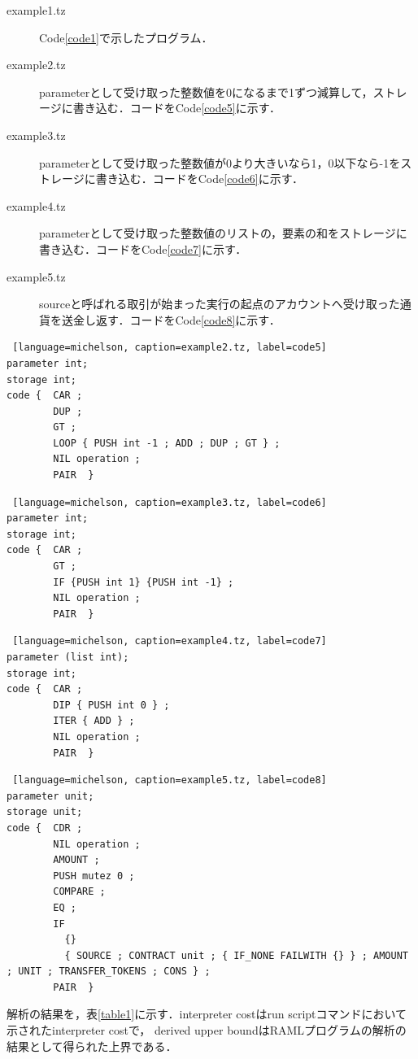 \documentclass{kuisthesis}
\begin{document}
\begin{description}
  \item [example1.tz] Code\ref{code1}で示したプログラム．
  \item [example2.tz] parameterとして受け取った整数値を0になるまで1ずつ減算して，ストレージに書き込む．コードをCode\ref{code5}に示す．
  \item [example3.tz] parameterとして受け取った整数値が0より大きいなら1，0以下なら-1をストレージに書き込む．コードをCode\ref{code6}に示す．
  \item [example4.tz] parameterとして受け取った整数値のリストの，要素の和をストレージに書き込む．コードをCode\ref{code7}に示す．
  \item [example5.tz] sourceと呼ばれる取引が始まった実行の起点のアカウントへ受け取った通貨を送金し返す．コードをCode\ref{code8}に示す．
\end{description}

\begin{lstlisting} [language=michelson, caption=example2.tz, label=code5]
parameter int;
storage int;
code {  CAR ;
        DUP ;
        GT ;
        LOOP { PUSH int -1 ; ADD ; DUP ; GT } ;
        NIL operation ;
        PAIR  }
\end{lstlisting}

\begin{lstlisting} [language=michelson, caption=example3.tz, label=code6]
parameter int;
storage int;
code {  CAR ;
        GT ;
        IF {PUSH int 1} {PUSH int -1} ;
        NIL operation ;
        PAIR  }
\end{lstlisting}

\begin{lstlisting} [language=michelson, caption=example4.tz, label=code7]
parameter (list int);
storage int;
code {  CAR ;
        DIP { PUSH int 0 } ;
        ITER { ADD } ;
        NIL operation ;
        PAIR  }
\end{lstlisting}

\begin{lstlisting} [language=michelson, caption=example5.tz, label=code8]
parameter unit;
storage unit;
code {  CDR ;
        NIL operation ;
        AMOUNT ;
        PUSH mutez 0 ;
        COMPARE ;
        EQ ;
        IF
          {}
          { SOURCE ; CONTRACT unit ; { IF_NONE FAILWITH {} } ; AMOUNT ; UNIT ; TRANSFER_TOKENS ; CONS } ;
        PAIR  }
\end{lstlisting}


解析の結果を，表\ref{table1}に示す．interpreter costはrun scriptコマンドにおいて示されたinterpreter costで，
derived upper boundはRAMLプログラムの解析の結果として得られた上界である．
\end{document}
